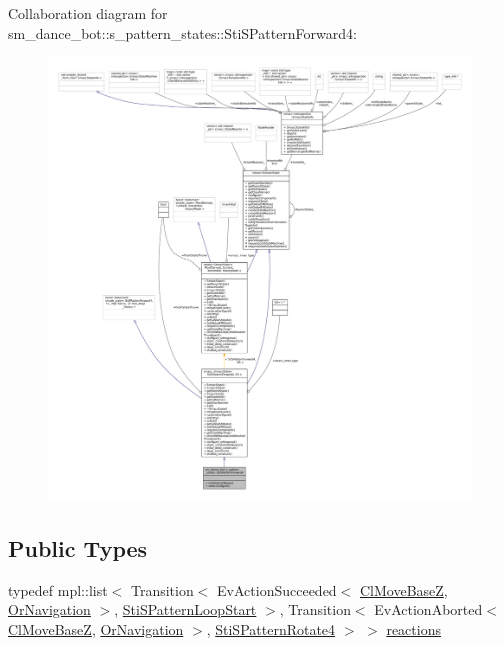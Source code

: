 Collaboration diagram for sm\+\_\+dance\+\_\+bot\+:\+:s\+\_\+pattern\+\_\+states\+:\+:Sti\+S\+Pattern\+Forward4\+:
\nopagebreak
\begin{figure}[H]
\begin{center}
\leavevmode
\includegraphics[width=350pt]{structsm__dance__bot_1_1s__pattern__states_1_1StiSPatternForward4__coll__graph}
\end{center}
\end{figure}
\subsection*{Public Types}
\begin{DoxyCompactItemize}
\item 
typedef mpl\+::list$<$ Transition$<$ Ev\+Action\+Succeeded$<$ \hyperlink{classcl__move__base__z_1_1ClMoveBaseZ}{Cl\+Move\+BaseZ}, \hyperlink{classsm__dance__bot_1_1OrNavigation}{Or\+Navigation} $>$, \hyperlink{structsm__dance__bot_1_1s__pattern__states_1_1StiSPatternLoopStart}{Sti\+S\+Pattern\+Loop\+Start} $>$, Transition$<$ Ev\+Action\+Aborted$<$ \hyperlink{classcl__move__base__z_1_1ClMoveBaseZ}{Cl\+Move\+BaseZ}, \hyperlink{classsm__dance__bot_1_1OrNavigation}{Or\+Navigation} $>$, \hyperlink{structsm__dance__bot_1_1s__pattern__states_1_1StiSPatternRotate4}{Sti\+S\+Pattern\+Rotate4} $>$ $>$ \hyperlink{structsm__dance__bot_1_1s__pattern__states_1_1StiSPatternForward4_a4a0eaecaf39945c6a9b01c8536898455}{reactions}
\end{DoxyCompactItemize}
